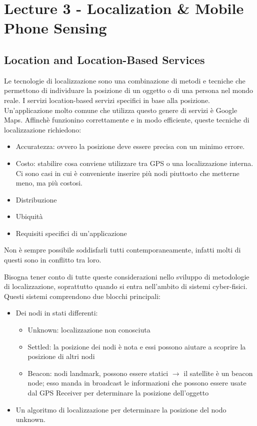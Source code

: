 \documentclass[12pt,a4paper]{article}
\begin{document}
	\section{Lecture 3 - Localization \& Mobile Phone Sensing}\label{sec3}
	
	\subsection{Location and Location-Based Services}\label{subsec3.1}
	Le tecnologie di localizzazione sono una combinazione di metodi e tecniche che permettono di individuare la posizione di un oggetto o di una persona nel mondo reale. I servizi location-based servizi specifici in base alla posizione. Un'applicazione molto comune che utilizza questo genere di servizi è Google Maps.
	Affinchè funzionino correttamente e in modo efficiente, queste tecniche di localizzazione richiedono:
	\begin{itemize}
		\item Accuratezza: ovvero la posizione deve essere precisa con un minimo errore.
		\item Costo: stabilire cosa conviene utilizzare tra GPS o una localizzazione interna. Ci sono casi in cui è conveniente inserire più nodi piuttosto che metterne meno, ma più costosi.
		\item Distribuzione
		\item Ubiquità
		\item Requisiti specifici di un'applicazione
	\end{itemize}
	Non è sempre possibile soddisfarli tutti contemporaneamente, infatti molti di questi sono in conflitto tra loro.
	
	Bisogna tener conto di tutte queste considerazioni nello sviluppo di metodologie di localizzazione, soprattutto quando si entra nell'ambito di sistemi cyber-fisici.
	Questi sistemi comprendono due blocchi principali:
	\begin{itemize}
		\item Dei nodi in stati differenti:
		\begin{itemize}
			\item Unknown: localizzazione non conosciuta
			\item Settled: la posizione dei nodi è nota e essi possono aiutare a scoprire la posizione di altri nodi
			\item Beacon: nodi landmark, possono essere statici $\rightarrow$ il satellite è un beacon node; esso manda in broadcast le informazioni che possono essere usate dal GPS Receiver per determinare la posizione dell'oggetto
		\end{itemize}
		\item Un algoritmo di localizzazione per determinare la posizione del nodo unknown.
	\end{itemize}
	
\end{document}
